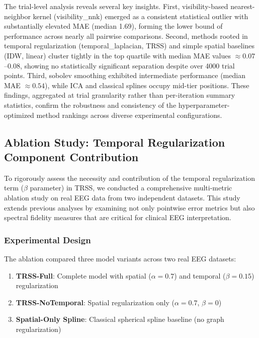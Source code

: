 The trial-level analysis reveals several key insights. First, visibility-based nearest-neighbor kernel (visibility\_nnk) emerged as a consistent statistical outlier with substantially elevated MAE (median 1.69), forming the lower bound of performance across nearly all pairwise comparisons. Second, methods rooted in temporal regularization (temporal\_laplacian, TRSS) and simple spatial baselines (IDW, linear) cluster tightly in the top quartile with median MAE values $\approx 0.07$–$0.08$, showing no statistically significant separation despite over 4000 trial points. Third, sobolev smoothing exhibited intermediate performance (median MAE $\approx 0.54$), while ICA and classical splines occupy mid-tier positions. These findings, aggregated at trial granularity rather than per-iteration summary statistics, confirm the robustness and consistency of the hyperparameter-optimized method rankings across diverse experimental configurations.

\subsection{Ablation Study: Temporal Regularization Component Contribution}
\label{sec:ablation}

To rigorously assess the necessity and contribution of the temporal regularization term ($\beta$ parameter) in TRSS, we conducted a comprehensive multi-metric ablation study on real EEG data from two independent datasets. This study extends previous analyses by examining not only pointwise error metrics but also spectral fidelity measures that are critical for clinical EEG interpretation.

\subsubsection{Experimental Design}

The ablation compared three model variants across two real EEG datasets:

\begin{enumerate}
  \item \textbf{TRSS-Full}: Complete model with spatial ($\alpha=0.7$) and temporal ($\beta=0.15$) regularization
  \item \textbf{TRSS-NoTemporal}: Spatial regularization only ($\alpha=0.7$, $\beta=0$)
  \item \textbf{Spatial-Only Spline}: Classical spherical spline baseline (no graph regularization)
\end{enumerate}

